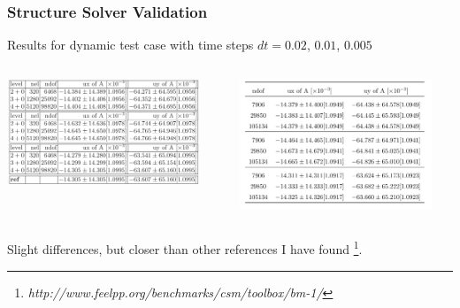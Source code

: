 \documentclass{beamer}
\begin{document}
\begin{frame}
\frametitle{Structure Solver Validation}
Results for dynamic test case with time steps $dt = 0.02$, $0.01$, $0.005$
\begin{columns}
\begin{column}{0.5\textwidth}
    \begin{center}
     \includegraphics[width=0.9\textwidth]{CSM_3_data}      
     \end{center}
\end{column}
\begin{column}{0.5\textwidth}
     \begin{center}
     \includegraphics[width=0.9\textwidth]{CSM_3_sim}      
     \end{center}

\end{column}
\end{columns}

Slight differences, but closer than other references I have found \footnote{\tiny \textit{http://www.feelpp.org/benchmarks/csm/toolbox/bm-1/}}.
\end{frame}
\end{document}
